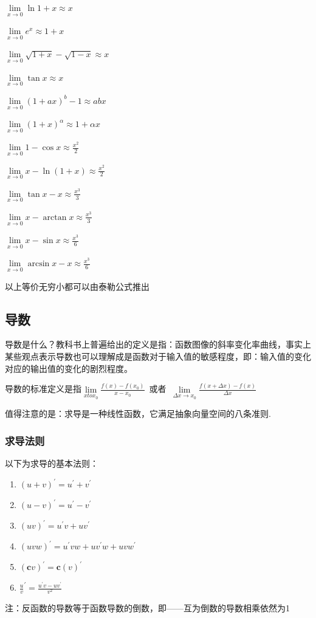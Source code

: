 \documentclass[UTF8]{ctexbook}
\newcommand{\limNormal}[1]{\lim\limits_{#1}}
\newcommand{\myLimToZero}{\limNormal{x \to 0}}
\newcommand{\derivative}{^\prime}
\begin{document}
{{{{    $\myLimToZero \ln1+x \approx x$

    $\myLimToZero e^x \approx 1+x$

    $\myLimToZero \sqrt{1 + x} - \sqrt{1 - x} \approx x$

    $\myLimToZero \tan{x} \approx x$

    $\myLimToZero (1 + ax)^b - 1 \approx abx$

    $\myLimToZero (1+x)^\alpha \approx 1+\alpha x$

    $\myLimToZero 1 - \cos x \approx \frac{x^2}{2}$

    $\myLimToZero x - \ln(1 + x) \approx \frac{x^2}{2}$

    $\myLimToZero \tan x - x \approx \frac{x^3}{3}$

    $\myLimToZero x - \arctan x \approx \frac{x^3}{3}$

    $\myLimToZero x - \sin x \approx \frac{x^3}{6}$

    $\myLimToZero \arcsin x - x \approx \frac{x^3}{6}$

    以上等价无穷小都可以由泰勒公式推出
  }%

}%

\subsection{导数}{
  导数是什么？教科书上普遍给出的定义是指：函数图像的斜率变化率曲线，事实上某些观点表示导数也可以理解成是函数对于输入值的敏感程度，即：输入值的变化对应的输出值的变化的剧烈程度。

  导数的标准定义是指$\limNormal{x to x_0}\frac{f(x) - f(x_0)}{x - x_0}$\ 或者\ $\limNormal{\Delta x \to x_0}\frac{f(x + \Delta x) - f(x)}{\Delta x}$

  值得注意的是：求导是一种线性函数，它满足抽象向量空间的八条准则.

  \subsubsection{求导法则}{
    以下为求导的基本法则：
    \begin{enumerate}
      \item $(u + v)\derivative = u\derivative + v\derivative$
      \item $(u - v)\derivative = u\derivative - v\derivative$
      \item $(uv)\derivative = u\derivative v + uv\derivative$
      \item $(uvw)\derivative = u\derivative vw + uv\derivative w + uvw\derivative$
      \item $(\mathbf{c}v)\derivative = \mathbf{c}(v)\derivative$
      \item $\frac{u}{v}\derivative = \frac{u\derivative v - uv\derivative}{v^2}$
    \end{enumerate}
    注：反函数的导数等于函数导数的倒数，即——互为倒数的导数相乘依然为1
  }%

}}}
\end{document}
